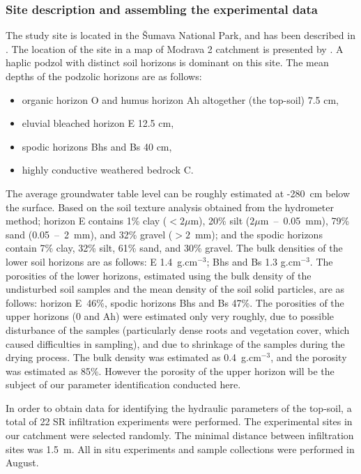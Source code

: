 \documentclass[review]{myarticle}
\begin{document}
\subsubsection{Site description and assembling the experimental data}%
\label{site}
The study site is located in the \v{S}umava National Park, and has been described in \citep{Jacka1}. The location of the site in a map of Modrava 2 catchment is presented by \cite{Jacka2}.
A haplic podzol with distinct soil horizons is dominant on this site. The mean depths of the podzolic horizons are as follows:
\begin{itemize}
\item organic horizon O and humus horizon Ah altogether (the top-soil) 7.5 cm, 
\item eluvial bleached horizon E 12.5 cm, 
\item spodic horizons Bhs and Bs 40 cm,
\item highly conductive weathered bedrock C.
\end{itemize}
The average groundwater table level can be roughly estimated at -280~cm below the surface. 
Based on the soil texture analysis obtained from the hydrometer method; horizon E contains 1\% clay ($<2\mu$m), 20\% silt ($ 2\mu$m~--~0.05~mm), 79\% sand (0.05~--~2~mm), and 32\% gravel  ($>2$~mm); and the spodic horizons contain 7\% clay, 32\% silt, 61\% sand, and 30\% gravel. The bulk densities of the lower soil horizons are as follows:
E 1.4~g.cm$^{-3}$; Bhs and Bs 1.3 g.cm$^{-3}$. The porosities of the lower horizons, estimated using the bulk density of the undisturbed soil samples and the mean density of the soil solid particles, are as follows: horizon E~46\%, spodic horizons Bhs and Bs 47\%. The porosities of the upper horizons (0 and Ah) were estimated only very roughly, due to  possible disturbance of the samples (particularly dense roots and vegetation cover, which caused difficulties in sampling), and due to shrinkage of the samples during the drying process. The bulk density was estimated as  0.4~g.cm$^{-3}$, and the porosity was estimated as 85\%. However the porosity of the upper horizon will be the subject of our parameter identification conducted here. 








In order to obtain data for identifying the hydraulic parameters of the top-soil, a total of 22 SR infiltration experiments were performed. The experimental sites in our catchment were  selected randomly. The minimal distance between infiltration sites was 1.5~m. All in situ experiments and sample collections were performed in August.
\end{document}
